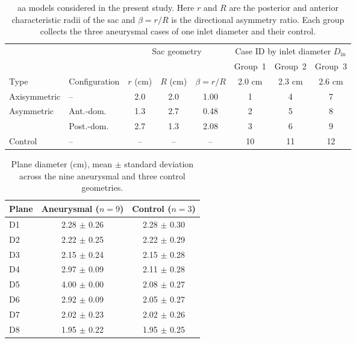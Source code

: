 \documentclass[12pt,a4paper]{article}
\newcommand{\AANcap}{\Ac{aa}\xspace}
\theoremstyle{definition}
\numberwithin{equation}{section}
\begin{document}
\begin{table}[htbp]
\centering
\caption{\AANcap models considered in the present study. Here $r$ and $R$ are the {posterior and anterior} characteristic radii of the sac and $\beta = r/R$ is the directional asymmetry ratio. Each group collects the three aneurysmal cases of one inlet diameter and their control.}
\label{tab:geometries}
\setlength{\tabcolsep}{4pt}
\begin{tabular}{ll ccc ccc}
\toprule
& & \multicolumn{3}{c}{Sac geometry}
  & \multicolumn{3}{c}{Case ID by inlet diameter \(D_{\mathrm{in}}\)} \\
\cmidrule(lr){3-5} \cmidrule(lr){6-8}
& & & & & Group~1 & Group~2 & Group~3 \\
Type & Configuration & \(r\) (cm) & \(R\) (cm) & \(\beta = r/R\)
     & 2.0 cm & 2.3 cm & 2.6 cm \\
\midrule
Axisymmetric & --         & 2.0 & 2.0 & 1.00 & 1  & 4  & 7  \\
Asymmetric   & Ant.-dom.  & 1.3 & 2.7 & 0.48 & 2  & 5  & 8  \\
             & Post.-dom. & 2.7 & 1.3 & 2.08 & 3  & 6  & 9  \\
Control      & --         & --  & --  & --   & 10 & 11 & 12 \\
\bottomrule
\end{tabular}
\end{table}


\begin{table}[htbp]
\centering
\caption{Plane diameter (cm), mean $\pm$ standard deviation across the nine aneurysmal and three control geometries.}
\begin{tabular}{lcc}
\toprule
Plane & Aneurysmal ($n=9$) & Control ($n=3$) \\
\midrule
D1 & 2.28 $\pm$ 0.26 & 2.28 $\pm$ 0.30 \\
D2 & 2.22 $\pm$ 0.25 & 2.22 $\pm$ 0.29 \\
D3 & 2.15 $\pm$ 0.24 & 2.15 $\pm$ 0.28 \\
D4 & 2.97 $\pm$ 0.09 & 2.11 $\pm$ 0.28 \\
D5 & 4.00 $\pm$ 0.00 & 2.08 $\pm$ 0.27 \\
D6 & 2.92 $\pm$ 0.09 & 2.05 $\pm$ 0.27 \\
D7 & 2.02 $\pm$ 0.23 & 2.02 $\pm$ 0.26 \\
D8 & 1.95 $\pm$ 0.22 & 1.95 $\pm$ 0.25 \\
\bottomrule
\end{tabular}
\label{tab:diameter}
\end{table}
\end{document}

